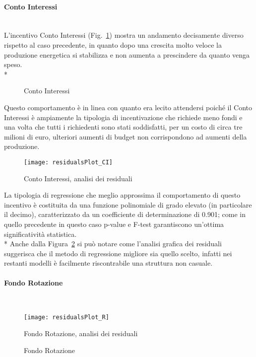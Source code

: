 \documentclass[12pt,a4paper,openright,twoside]{report}
\newcommand{\myparagraph}[1]{\paragraph{#1}\mbox{}\\}
\begin{document}
\myparagraph{Conto Interessi}

L'incentivo Conto Interessi (Fig.~\ref{graphSimCI}) mostra un andamento decisamente diverso rispetto al caso precedente, in quanto dopo una crescita molto veloce la produzione energetica si stabilizza e non aumenta a prescindere da quanto venga speso. \\* 

\begin{figure}[H]
	\centering
	\qquad
	\caption{Conto Interessi}
	\label{graphSimCI}
\end{figure}

Questo comportamento è in linea con quanto era lecito attendersi poiché il Conto Interessi è ampiamente la tipologia di incentivazione che richiede meno fondi e una volta che tutti i richiedenti sono stati soddisfatti, per un costo di circa tre milioni di euro, ulteriori aumenti di budget non corrispondono ad aumenti della produzione.

\begin{figure}[hbt]
	\centering
	\texttt{[image: residualsPlot\_CI]}
	\caption{Conto Interessi, analisi dei residuali}
	\label{residualsPlot_CI}
\end{figure}

La tipologia di regressione che meglio approssima il comportamento di questo incentivo è costituita da una funzione polinomiale di grado elevato (in particolare il decimo), caratterizzato da un coefficiente di determinazione di 0.901; come in quello precedente in questo caso p-value e F-test garantiscono un'ottima significatività statistica.\\* 
Anche dalla Figura~\ref{residualsPlot_CI} si può notare come l'analisi grafica dei residuali suggerisca che il metodo di regressione migliore sia quello scelto, infatti nei restanti modelli è facilmente riscontrabile una struttura non casuale.

\myparagraph{Fondo Rotazione}

\begin{figure}[hbt]
	\centering
	\texttt{[image: residualsPlot\_R]}
	\caption{Fondo Rotazione, analisi dei residuali}
	\label{residualsPlot_R}
\end{figure}

\begin{figure}[H]
	\centering
	\qquad
	\caption{Fondo Rotazione}
	\label{graphSimR}
\end{figure}
\end{document}
